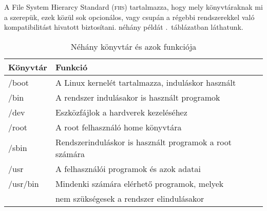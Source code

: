 A File System Hierarcy Standard (\textsc{fhs}) tartalmazza, hogy mely
könyvtáraknak mi a szerepük, ezek közül sok opcionálos, vagy csupán a régebbi
rendszerekkel való kompatibilitást hivatott biztosítani. néhány példát
.\ táblázatban láthatunk.


\begin{table}%
\center%
\begin{tabular}{@{}ll@{}}\toprule
Könyvtár & Funkció\\\midrule
/boot & A Linux kernelét tartalmazza, induláskor használt\\
/bin  & A rendszer indulásakor is használt programok\\
/dev  & Eszközfájlok a hardverek kezeléséhez\\
/root & A root felhasználó home könyvtára\\
/sbin & Rendszerinduláskor is használt programok a root számára\\
/usr  & A felhasználói programok és azok adatai\\
/usr/bin & Mindenki számára elérhető programok, melyek\\
& nem szükségesek a rendszer elindulásakor
\\\bottomrule
\end{tabular}
  \caption{Néhány könyvtár és azok funkciója}
  \label{tab:linux-fs}
\end{table}






